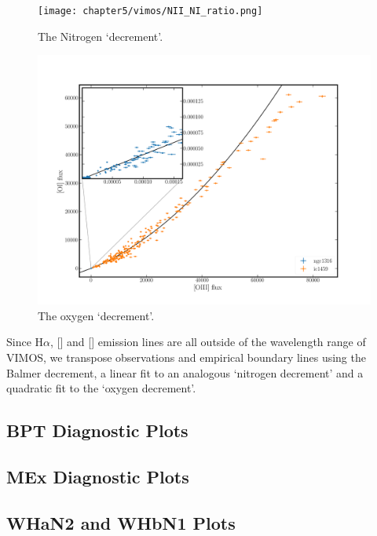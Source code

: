 		\begin{figure}
			\centering
			\texttt{[image: chapter5/vimos/NII\_NI\_ratio.png]}
			\caption[The nitrogen `decrement']{The Nitrogen `decrement'.} 
			\label{fig:NII_NI}
		\end{figure}

		\begin{figure}
			\centering
			\includegraphics[width=\textwidth]{chapter5/OIII_OI_ratio.png}
			\caption[The oxygen `decrement']{The oxygen `decrement'.} 
			\label{fig:OI_OIII}
		\end{figure}



		Since H$\alpha$, [] and [] emission lines are all outside of the wavelength range of VIMOS, we transpose observations and empirical boundary lines  
		using the Balmer decrement, a linear fit to an analogous `nitrogen decrement' and a quadratic fit to the `oxygen decrement'.

	\subsection{BPT Diagnostic Plots}
		\label{subsec:BPT}


	\subsection{MEx Diagnostic Plots}
		\label{subsec:MEx}


	\subsection{WHaN2 and WHbN1 Plots}
		\label{subsec:WHaN2}


